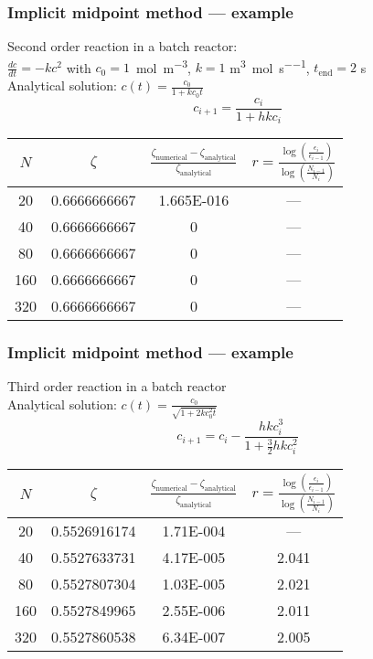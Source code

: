 \documentclass[11pt,table,final,fleqn,xcolor={usenames,dvipsnames,table}]{beamer}
\begin{document}
\begin{frame}
  \frametitle{Implicit midpoint method --- example}
  {\color{tuealert}Second order} reaction in a batch reactor:\\
  $\frac{dc}{dt} = -kc^2$ with $c_0 = 1$~\si{\mole\per\cubic\meter}, $k = 1$ \si{\cubic\meter\per\mole\per\second}, $t_\text{end} = 2$ \si{\second}\\
  Analytical solution: $c(t) = \frac{c_0}{1+kc_0t}$
  \[
    c_{i+1} = \frac{c_i}{1+hkc_i}
  \]
  \pause  
  \begin{longtable}{cccc}
    \hline
    $N$ & $\zeta$ & $\frac{\zeta^{}_\text{numerical}-\zeta_\text{analytical}}{\zeta_\text{analytical}}$ & $ r = \frac{\log\left(\frac{\epsilon_i}{\epsilon_{i-1}}\right)}{\log \left( \frac{N_{i-1}}{N_i}\right)} $ \\ \hline
    20  & 0.6666666667 & \num{1.665E-016} & ---\\
    40  & 0.6666666667 & \num{0} & ---\\
    80  & 0.6666666667 & \num{0} & ---\\
    160 & 0.6666666667 & \num{0} & ---\\
    320 & 0.6666666667 & \num{0} & ---\\
    \hline
  \end{longtable}
\end{frame}

\begin{frame}
  \frametitle{Implicit midpoint method --- example}
  {\color{tuealert}Third order} reaction in a batch reactor\\
  Analytical solution: $c(t) = \frac{c_0}{\sqrt{1+2kc_0^2t}}$
  \[
    c_{i+1} = c_i - \frac{hkc_i^3}{1+\frac{3}{2}hkc_i^2}
  \]
  \pause  
  \begin{longtable}{cccc}
    \hline
    $N$ & $\zeta$ & $\frac{\zeta^{}_\text{numerical}-\zeta_\text{analytical}}{\zeta_\text{analytical}}$ & $ r = \frac{\log\left(\frac{\epsilon_i}{\epsilon_{i-1}}\right)}{\log \left( \frac{N_{i-1}}{N_i}\right)} $ \\ \hline
    20  & 0.5526916174 & \num{1.71E-004} & ---\\
    40  & 0.5527633731 & \num{4.17E-005} & 2.041\\
    80  & 0.5527807304 & \num{1.03E-005} & 2.021\\
    160 & 0.5527849965 & \num{2.55E-006} & 2.011\\
    320 & 0.5527860538 & \num{6.34E-007} & 2.005\\
    \hline
  \end{longtable}
\end{frame}
\end{document}
